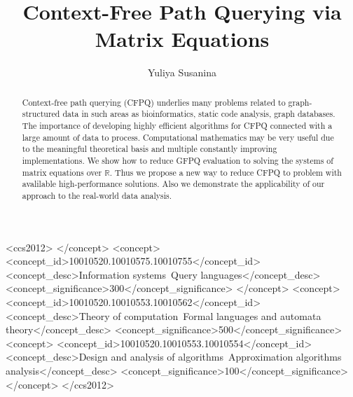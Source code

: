 \documentclass[sigconf]{acmart}
\begin{document}
\title{Context-Free Path Querying via Matrix Equations}

\author{Yuliya Susanina}





\begin{abstract}
  Context-free path querying (CFPQ) underlies many problems related to graph-structured data in such areas as bioinformatics, static code analysis, graph databases.
  The importance of developing highly efficient algorithms for CFPQ connected with a large amount of data to process.
  Computational mathematics may be very useful due to the meaningful theoretical basis and multiple constantly improving implementations.
  We show how to reduce GFPQ evaluation to solving the systems of matrix equations over $\mathbb{R}$.
  Thus we propose a new way to reduce CFPQ to problem with avalilable high-performance solutions.
  Also we demonstrate the applicability of our approach to the real-world data analysis.
\end{abstract}

\begin{CCSXML}
<ccs2012>
 </concept>
 <concept>
  <concept_id>10010520.10010575.10010755</concept_id>
  <concept_desc>Information systems~Query languages</concept_desc>
  <concept_significance>300</concept_significance>
 </concept>
 <concept>
  <concept_id>10010520.10010553.10010562</concept_id>
  <concept_desc>Theory of computation~Formal languages and automata theory</concept_desc>
  <concept_significance>500</concept_significance>
 <concept>
  <concept_id>10010520.10010553.10010554</concept_id>
  <concept_desc>Design and analysis of algorithms~Approximation algorithms analysis</concept_desc>
  <concept_significance>100</concept_significance>
 </concept>
</ccs2012>
\end{CCSXML}
\end{document}
